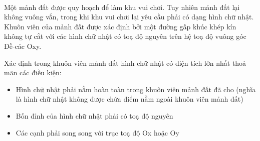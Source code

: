  

Một mảnh đất được quy hoạch để làm khu vui chơi. Tuy nhiên mảnh đất lại không vuông vắn, trong khi khu vui chơi lại yêu cầu phải có dạng hình chữ nhật. Khuôn viên của mảnh đất được xác định bởi một đường gấp khúc khép kín không tự cắt với các hình chữ nhật có toạ độ nguyên trên hệ toạ độ vuông góc Đề-các Oxy.

Xác định trong khuôn viên mảnh đất hình chữ nhật có diện tích lớn nhất thoả mãn các điều kiện:
\begin{itemize}
	\item Hình chữ nhật phải nằm hoàn toàn trong khuôn viên mảnh đất đã cho (nghĩa là hình chữ nhật không được chứa điểm nằm ngoài khuôn viên mảnh đất)
	\item Bốn đỉnh của hình chữ nhật phải có toạ độ nguyên
	\item Các cạnh phải song song với trục toạ độ Ox hoặc Oy
\end{itemize}

\